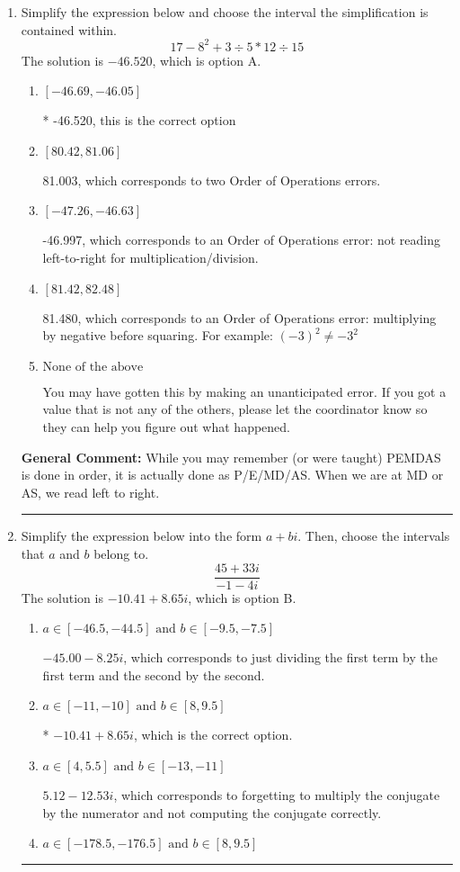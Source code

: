 \documentclass{extbook}[14pt]
\newcommand{\litem}[1]{\item #1

\rule{\textwidth}{0.4pt}}
\begin{document}
\begin{enumerate}\litem{
Simplify the expression below and choose the interval the simplification is contained within.
\[ 17 - 8^2 + 3 \div 5 * 12 \div 15 \]
The solution is \( -46.520 \), which is option A.\begin{enumerate}[label=\Alph*.]
\item \( [-46.69, -46.05] \)

* -46.520, this is the correct option
\item \( [80.42, 81.06] \)

 81.003, which corresponds to two Order of Operations errors.
\item \( [-47.26, -46.63] \)

 -46.997, which corresponds to an Order of Operations error: not reading left-to-right for multiplication/division.
\item \( [81.42, 82.48] \)

 81.480, which corresponds to an Order of Operations error: multiplying by negative before squaring. For example: $(-3)^2 \neq -3^2$
\item \( \text{None of the above} \)

 You may have gotten this by making an unanticipated error. If you got a value that is not any of the others, please let the coordinator know so they can help you figure out what happened.
\end{enumerate}

\textbf{General Comment:} While you may remember (or were taught) PEMDAS is done in order, it is actually done as P/E/MD/AS. When we are at MD or AS, we read left to right.
}
\litem{
Simplify the expression below into the form $a+bi$. Then, choose the intervals that $a$ and $b$ belong to.
\[ \frac{45 + 33 i}{-1 - 4 i} \]
The solution is \( -10.41  + 8.65 i \), which is option B.\begin{enumerate}[label=\Alph*.]
\item \( a \in [-46.5, -44.5] \text{ and } b \in [-9.5, -7.5] \)

 $-45.00  - 8.25 i$, which corresponds to just dividing the first term by the first term and the second by the second.
\item \( a \in [-11, -10] \text{ and } b \in [8, 9.5] \)

* $-10.41  + 8.65 i$, which is the correct option.
\item \( a \in [4, 5.5] \text{ and } b \in [-13, -11] \)

 $5.12  - 12.53 i$, which corresponds to forgetting to multiply the conjugate by the numerator and not computing the conjugate correctly.
\item \( a \in [-178.5, -176.5] \text{ and } b \in [8, 9.5] \)


\end{enumerate}}
\end{enumerate}
\end{document}

